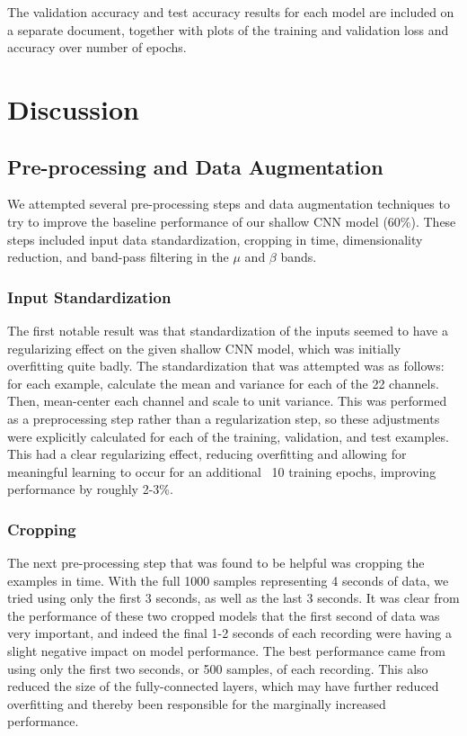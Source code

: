 \documentclass[10pt,twocolumn,letterpaper]{article}
\begin{document}
The validation accuracy and test accuracy results for each model are included
on a separate document, together with plots of the training and validation loss
and accuracy over number of epochs.

\section{Discussion}
\subsection{Pre-processing and Data Augmentation}
We attempted several pre-processing steps and data augmentation techniques to
try to improve the baseline performance of our shallow CNN model (60\%).
These steps included input data standardization, cropping in time,
dimensionality reduction, and band-pass filtering in the $\mu$ and $\beta$
bands.

\subsubsection{Input Standardization}
The first notable result was that standardization of the inputs seemed to have a
regularizing effect on the given shallow CNN model, which was initially
overfitting quite badly. The standardization that was attempted was as follows:
for each example, calculate the mean and variance for each of the 22 channels. 
Then, mean-center each channel and scale to unit variance. This was performed as
a preprocessing step rather than a regularization step, so these adjustments
were explicitly calculated for each of the training, validation, and test
examples. This had a clear regularizing effect, reducing overfitting and
allowing for meaningful learning to occur for an additional ~10 training epochs,
improving performance by roughly 2-3\%.

\subsubsection{Cropping}
The next pre-processing step that was found to be helpful was cropping the
examples in time. With the full 1000 samples representing 4 seconds of data, we
tried using only the first 3 seconds, as well as the last 3 seconds. It was
clear from the performance of these two cropped models that the first second of
data was very important, and indeed the final 1-2 seconds of each recording were
having a slight negative impact on model performance. The best performance came
from using only the first two seconds, or 500 samples, of each recording. This
also reduced the size of the fully-connected layers, which may have further
reduced overfitting and thereby been responsible for the marginally increased
performance.
\end{document}
